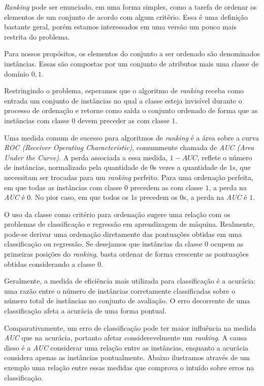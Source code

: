 \emph{Ranking} pode ser enunciado, em uma forma simples, como a tarefa de
ordenar os elementos de um conjunto de acordo com algum critério. Essa é uma
definição bastante geral, porém estamos interessados em uma versão um pouco mais
restrita do problema.

Para nossos propósitos, os elementos do conjunto a ser ordenado são denominados
instâncias. Essas são compostas por um conjunto de atributos mais uma classe de
domínio ${0, 1}$.

Restringindo o problema, esperamos que o algoritmo de \emph{ranking} receba como
entrada um conjunto de instâncias no qual a classe esteja invisível durante o
processo de ordenação e retorne como saída o conjunto ordenado de forma que as
instâncias com classe $0$ devem preceder as com classe $1$.

Uma medida comum de sucesso para algoritmos de \emph{ranking} é a área sobre a
curva \emph{ROC (Receiver Operating Characteristic)}, comummente chamada de
\emph{AUC (Area Under the Curve)}. A perda associada a essa medida, $1 - AUC$,
reflete o número de instâncias, normalizado pela quantidade de $0$s vezes a
quantidade de $1$s, que necessitam ser trocadas para um \emph{ranking} perfeito.
Para uma ordenação perfeita, em que todas as instâncias com classe $0$ precedem
as com classe $1$, a perda na \emph{AUC} é $0$. No pior caso, em que todos os
$1$s precedem os $0$s, a perda na \emph{AUC} é $1$.

O uso da classe como critério para ordenação sugere uma relação com os problemas
de classificação e regressão em aprendizagem de máquina. Realmente, pode-se
derivar uma ordenação diretamente das pontuações obtidas em uma classificação ou
regressão. Se desejamos que instâncias da classe $0$ ocupem as primeiras
posições do \emph{ranking}, basta ordenar de forma crescente as pontuações
obtidas considerando a classe $0$.

Geralmente, a medida de eficiência mais utilizada para classificação é a
acurácia: uma razão entre o número de instâncias corretamente classificadas
sobre o número total de instâncias no conjunto de avaliação. O erro decorrente
de uma classificação afeta a acurácia de uma forma pontual.

Comparativamente, um erro de classificação pode ter maior influência na medida
\emph{AUC} que na acurácia, portanto afetar considerevelmente um \emph{ranking}.
A causa disso é a \emph{AUC} considerar uma relação entre as instâncias,
enquanto a acurácia considera apenas as instâncias pontualmente. Abaixo
ilustramos através de um exemplo uma relação entre essas medidas que comprova o
intuído sobre erros na classificação.


